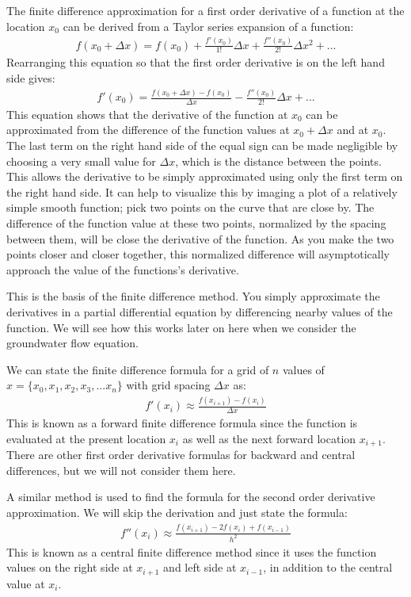 \documentclass[11pt, oneside]{article}   	%
\begin{document}
 The finite difference approximation for a first order derivative of a function at the location $x_0$ can be derived from a Taylor series expansion of a function:
 \begin{eqnarray}
f(x_0 + \Delta x) = f(x_0) + \frac{f'(x_0)}{1!} \Delta x + \frac{f''(x_0)}{2!}\Delta x^2 + ...
\end{eqnarray}
Rearranging this equation so that the first order derivative is on the left hand side gives:
\begin{eqnarray}
f'(x_0) = \frac{f(x_0 + \Delta x) - f(x_0)}{\Delta x} - \frac{f''(x_0)}{2!} \Delta x + ...
\end{eqnarray}
This equation shows that  the derivative of the function at $x_0$ can be approximated from the difference of the function values at $x_0+ \Delta x$ and at $x_0$.   The last term on the right hand side of the equal sign can be made negligible by choosing a very small value for $\Delta x$, which is the distance between the points. This allows the derivative to be simply approximated using only the first term on the right hand side. It can help to visualize this by imaging a plot of a relatively simple smooth function; pick two points on the curve that are close by. The difference of the function value at these two points, normalized by the spacing between them, will be close the derivative of the function. As you make the two points closer and closer together, this normalized difference will asymptotically approach the value of the functions's derivative.
 
This is the basis of the finite difference method. You simply approximate the derivatives in a partial differential equation by differencing nearby values of the function. We will see how this works later on here when we consider the groundwater flow equation.

We can state the finite difference formula for a grid of $n$ values of $x = \{x_0, x_1, x_2, x_3, ... x_n\}$ with grid spacing $\Delta x$ as:
\begin{eqnarray}
f'(x_i) \approx \frac{f(x_{i+1}) - f(x_i)}{\Delta x} 
\label{FOFD}
\end{eqnarray}
This is known as a forward finite difference formula since the function is evaluated at the present location $x_i$ as well as the next forward location $x_{i+1}$. There are other first order derivative formulas for backward and central differences, but we will not consider them here.

A similar method is used to find the formula for the second order derivative approximation. We will skip the derivation and just state the formula:
\begin{eqnarray}
f''(x_i) \approx \frac{f(x_{i+1}) - 2 f(x_i) + f(x_{i-1})  }{h^2} 
\label{SOFD}
\end{eqnarray}
This is known as a central finite difference method since it uses the function  values on the right side at $x_{i+1}$ and left side at $x_{i-1}$, in addition to the central value at $x_i$.
\end{document}
